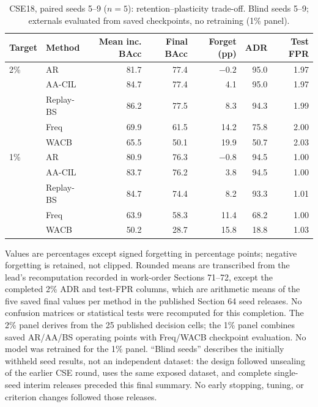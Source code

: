 \begin{table}[t]
\centering\small
\caption{CSE18, paired seeds 5--9 ($n=5$): retention--plasticity trade-off. Blind seeds 5--9; externals evaluated from saved checkpoints, no retraining (1\% panel).}\label{tab:cse-new-seed-tradeoff}
\begin{tabular}{llrrrrr}
\toprule
Target & Method & Mean inc. BAcc & Final BAcc & Forget (pp) & ADR & Test FPR \\
\midrule
2\% & AR & 81.7 & 77.4 & $-0.2$ & 95.0 & 1.97 \\
 & AA-CIL & 84.7 & 77.4 & 4.1 & 95.0 & 1.97 \\
 & Replay-BS & 86.2 & 77.5 & 8.3 & 94.3 & 1.99 \\
 & Freq & 69.9 & 61.5 & 14.2 & 75.8 & 2.00 \\
 & WACB & 65.5 & 50.1 & 19.9 & 50.7 & 2.03 \\
\midrule
1\% & AR & 80.9 & 76.3 & $-0.8$ & 94.5 & 1.00 \\
 & AA-CIL & 83.7 & 76.2 & 3.8 & 94.5 & 1.00 \\
 & Replay-BS & 84.7 & 74.4 & 8.2 & 93.3 & 1.01 \\
 & Freq & 63.9 & 58.3 & 11.4 & 68.2 & 1.00 \\
 & WACB & 50.2 & 28.7 & 15.8 & 18.8 & 1.03 \\
\bottomrule
\end{tabular}
\par\smallskip\begin{minipage}{.97\textwidth}\footnotesize
Values are percentages except signed forgetting in percentage points; negative forgetting is retained, not clipped. Rounded means are transcribed from the lead's recomputation recorded in work-order Sections 71--72, except the completed 2\% ADR and test-FPR columns, which are arithmetic means of the five saved final values per method in the published Section 64 seed releases. No confusion matrices or statistical tests were recomputed for this completion. The 2\% panel derives from the 25 published decision cells; the 1\% panel combines saved AR/AA/BS operating points with Freq/WACB checkpoint evaluation. No model was retrained for the 1\% panel. ``Blind seeds'' describes the initially withheld seed results, not an independent dataset: the design followed unsealing of the earlier CSE round, uses the same exposed dataset, and complete single-seed interim releases preceded this final summary. No early stopping, tuning, or criterion changes followed those releases.
\end{minipage}
\end{table}

